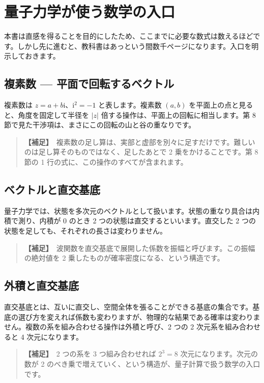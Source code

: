 \documentclass{article}
\begin{document}
\section{量子力学が使う数学の入口}

本書は直感を得ることを目的にしたため、ここまでに必要な数式は数えるほどです。しかし先に進むと、教科書はあっという間数千ページになります。入口を明示しておきます。

\subsection{複素数 — 平面で回転するベクトル}

複素数は \( z = a + b\mathrm{i} \)、\( \mathrm{i}^2 = -1 \) と表します。複素数 \( (a, b) \) を平面上の点と見ると、角度を固定して半径を \( |z| \) 倍する操作は、平面上の回転に相当します。第 8 節で見た干渉項は、まさにこの回転の山と谷の重なりです。

\begin{quote}
\textbf{【補足】}\ 複素数の足し算は、実部と虚部を別々に足すだけです。難しいのは足し算そのものではなく、足したあとで 2 乗をかけることです。第 8 節の 1 行の式に、この操作のすべてが含まれます。
\end{quote}

\subsection{ベクトルと直交基底}

量子力学では、状態を多次元のベクトルとして扱います。状態の重なり具合は内積で測り、内積が 0 のとき 2 つの状態は直交するといいます。直交した 2 つの状態を足しても、それぞれの長さは変わりません。

\begin{quote}
\textbf{【補足】}\ 波関数を直交基底で展開した係数を振幅と呼びます。この振幅の絶対値を 2 乗したものが確率密度になる、という構造です。
\end{quote}

\subsection{外積と直交基底}

直交基底とは、互いに直交し、空間全体を張ることができる基底の集合です。基底の選び方を変えれば係数も変わりますが、物理的な結果である確率は変わりません。複数の系を組み合わせる操作は外積と呼び、2 つの 2 次元系を組み合わせると 4 次元になります。

\begin{quote}
\textbf{【補足】}\ 2 つの系を 3 つ組み合わせれば \(2^3 = 8\) 次元になります。次元の数が 2 のべき乗で増えていく、という構造が、量子計算で扱う数学の入口です。
\end{quote}
\end{document}

